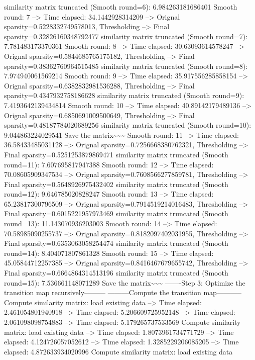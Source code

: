 \documentclass[letterpaper,10pt,english]{sphinxmanual}
\begin{document}
{\begin{sphinxVerbatim}[commandchars=\\\{\}]
similarity matrix truncated (Smooth round=6):  6.984263181686401
Smooth round: 7
--> Time elapsed: 34.1442928314209
--> Orignal sparsity=0.5228332749578013, Thresholding
--> Final sparsity=0.32826160348792477
similarity matrix truncated (Smooth round=7):  7.781483173370361
Smooth round: 8
--> Time elapsed: 30.63093614578247
--> Orignal sparsity=0.5844685765175182, Thresholding
--> Final sparsity=0.38362760964515485
similarity matrix truncated (Smooth round=8):  7.974940061569214
Smooth round: 9
--> Time elapsed: 35.917556285858154
--> Orignal sparsity=0.6382832981536288, Thresholding
--> Final sparsity=0.4347932758186628
similarity matrix truncated (Smooth round=9):  7.4193642139434814
Smooth round: 10
--> Time elapsed: 40.89142179489136
--> Orignal sparsity=0.6850691009500649, Thresholding
--> Final sparsity=0.48187784020689256
similarity matrix truncated (Smooth round=10):  9.044863224029541
Save the matrix\textasciitilde{}\textasciitilde{}\textasciitilde{}
Smooth round: 11
--> Time elapsed: 36.58433485031128
--> Orignal sparsity=0.7256668380762321, Thresholding
--> Final sparsity=0.5251253879869471
similarity matrix truncated (Smooth round=11):  7.607695817947388
Smooth round: 12
--> Time elapsed: 70.08605909347534
--> Orignal sparsity=0.7608566277859781, Thresholding
--> Final sparsity=0.5648926975432402
similarity matrix truncated (Smooth round=12):  9.646785020828247
Smooth round: 13
--> Time elapsed: 65.23817300796509
--> Orignal sparsity=0.7914519214016483, Thresholding
--> Final sparsity=0.6015221957973469
similarity matrix truncated (Smooth round=13):  11.143070936203003
Smooth round: 14
--> Time elapsed: 70.58985090255737
--> Orignal sparsity=0.8182097402031955, Thresholding
--> Final sparsity=0.6353063058254474
similarity matrix truncated (Smooth round=14):  8.404071807861328
Smooth round: 15
--> Time elapsed: 45.05844712257385
--> Orignal sparsity=0.8416467679655742, Thresholding
--> Final sparsity=0.6664864314513196
similarity matrix truncated (Smooth round=15):  7.536661148071289
Save the matrix\textasciitilde{}\textasciitilde{}\textasciitilde{}
-------Step 3: Optimize the transition map recursively---------
---------Compute the transition map-----------
Compute similarity matrix: load existing data
--> Time elapsed:  2.461054801940918
--> Time elapsed:  5.206609725952148
--> Time elapsed:  2.061098098754883
--> Time elapsed:  5.179265737533569
Compute similarity matrix: load existing data
--> Time elapsed:  1.8073961734771729
--> Time elapsed:  4.124726057052612
--> Time elapsed:  1.3285229206085205
--> Time elapsed:  4.872633934020996
Compute similarity matrix: load existing data

\end{sphinxVerbatim}}
\end{document}
